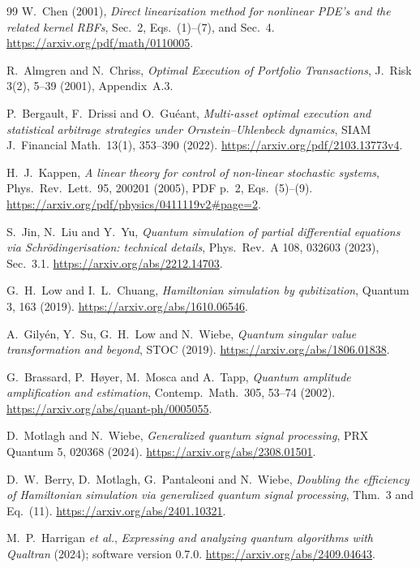 \documentclass[11pt,a4paper]{article}
\begin{document}
\begin{thebibliography}{99}
 W.~Chen (2001),
\emph{Direct linearization method for nonlinear PDE's and the related
kernel RBFs}, Sec.~2, Eqs.~(1)--(7), and Sec.~4.
\url{https://arxiv.org/pdf/math/0110005}.

 R.~Almgren and N.~Chriss,
\emph{Optimal Execution of Portfolio Transactions}, J.~Risk 3(2), 5--39
(2001), Appendix~A.3.

 P.~Bergault, F.~Drissi and O.~Gu\'eant,
\emph{Multi-asset optimal execution and statistical arbitrage strategies
under Ornstein--Uhlenbeck dynamics}, SIAM J.~Financial Math.~13(1),
353--390 (2022). \url{https://arxiv.org/pdf/2103.13773v4}.

 H.~J.~Kappen, \emph{A linear theory for control of
non-linear stochastic systems}, Phys.~Rev.~Lett.~95, 200201 (2005),
PDF p.~2, Eqs.~(5)--(9).
\url{https://arxiv.org/pdf/physics/0411119v2#page=2}.

 S.~Jin, N.~Liu and Y.~Yu,
\emph{Quantum simulation of partial differential equations via
Schr\"odingerisation: technical details}, Phys.~Rev.~A 108, 032603 (2023),
Sec.~3.1. \url{https://arxiv.org/abs/2212.14703}.

 G.~H.~Low and I.~L.~Chuang,
\emph{Hamiltonian simulation by qubitization}, Quantum 3, 163 (2019).
\url{https://arxiv.org/abs/1610.06546}.

 A.~Gily\'en, Y.~Su, G.~H.~Low and N.~Wiebe,
\emph{Quantum singular value transformation and beyond}, STOC (2019).
\url{https://arxiv.org/abs/1806.01838}.

 G.~Brassard, P.~H\o yer, M.~Mosca and A.~Tapp,
\emph{Quantum amplitude amplification and estimation}, Contemp.~Math.~305,
53--74 (2002). \url{https://arxiv.org/abs/quant-ph/0005055}.

 D.~Motlagh and N.~Wiebe,
\emph{Generalized quantum signal processing}, PRX Quantum 5, 020368 (2024).
\url{https://arxiv.org/abs/2308.01501}.

 D.~W.~Berry, D.~Motlagh, G.~Pantaleoni and
N.~Wiebe, \emph{Doubling the efficiency of Hamiltonian simulation via
generalized quantum signal processing}, Thm.~3 and Eq.~(11).
\url{https://arxiv.org/abs/2401.10321}.

 M.~P.~Harrigan \emph{et al.}, \emph{Expressing and
analyzing quantum algorithms with Qualtran} (2024); software version 0.7.0.
\url{https://arxiv.org/abs/2409.04643}.


\end{thebibliography}
\end{document}

